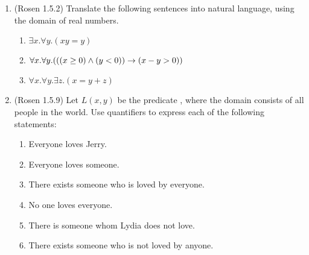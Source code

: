 \begin{enumerate}
\begin{enumerate}
\end{enumerate}


\item \strmedium (Rosen 1.5.2) Translate the following sentences into natural language, using the domain of real numbers.

\begin{enumerate}
\item $\exists x. \forall y. (xy=y)$

\item $\forall x. \forall y. (((x \geq 0) \wedge (y < 0)) \rightarrow (x-y>0))$

\item $\forall x. \forall y. \exists z. (x = y + z)$

\end{enumerate}


\item (Rosen 1.5.9) Let $L(x,y)$ be the predicate , where the domain consists of all people in the world. Use quantifiers to express each of the following statements:
\begin{enumerate}
\item \streasy Everyone loves Jerry.

\item \streasy Everyone loves someone.

\item \streasy There exists someone who is loved by everyone.

\item \streasy No one loves everyone.

\item \streasy There is someone whom Lydia does not love.

\item \streasy There exists someone who is not loved by anyone.


\end{enumerate}
\end{enumerate}

